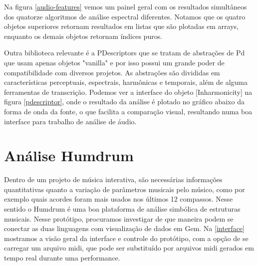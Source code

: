 \documentclass{ppgmus}
\begin{document}
Na figura \ref{audio-features} vemos um painel geral com os resultados simultâneos dos quatorze
algoritmos de análise espectral diferentes. Notamos que os quatro objetos superiores retornam resultados em 
listas que são plotadas em arrays, enquanto os demais objetos retornam índices puros.

Outra  biblioteca relevante é a PDescriptors \cite{monteiro} que se tratam
de abstrações de Pd que usam apenas objetos "vanilla" e por isso possui um
grande poder de compatibilidade com diversos projetos. As abstrações
são divididas em características perceptuais, espectrais, harmônicas e temporais, além
de alguma ferramentas de transcrição. Podemos ver a interface do objeto [Inharmonicity\texttildelow]
na figura \ref{pdescriptor}, onde o resultado da análise é plotado no gráfico abaixo da forma de 
onda da fonte, o que facilita a comparação visual, resultando numa boa interface para trabalho de análise de áudio.



\pagebreak 



\section{Análise Humdrum}

  Dentro de um projeto de música interativa, são necessárias informações quantitativas quanto a 
variação de parâmetros musicais pelo músico, como por exemplo quais acordes foram mais usados 
nos últimos 12 compassos.
Nesse sentido o Humdrum é uma boa plataforma de análise simbólica de estruturas musicais. 
Nesse protótipo, procuramos investigar de que maneira podem se conectar as duas linguagens 
com visualização de dados em Gem.
Na \ref{interface} mostramos a visão geral da interface e controle
do protótipo, com a opção de se carregar um arquivo midi, 
que pode ser substituído por arquivos midi gerados em tempo real 
durante uma performance.

\end{document}
